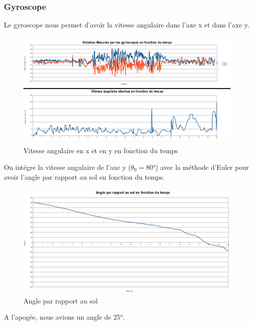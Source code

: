 \documentclass[a4paper,12pt]{scrartcl}
\begin{document}
	  \subsubsection{Gyroscope}
	  Le gyroscope nous permet d'avoir la vitesse angulaire dans l'axe x et dans l'axe y.
	  \begin{figure}[H]
		\begin{center}
		    \caption{ Vitesse angulaire en x et en y en fonction du temps }
		    \includegraphics[height=219px, width=458px]{analyse/rotation-vitesse-angulaire.png}
		\end{center}
	  \end{figure}
	  On intégre la vitesse angulaire de l'axe y ($\theta_0 = 80°$) avec la méthode d'Euler pour avoir l'angle par rapport au sol en fonction du temps.
	  \begin{figure}[H]
		\begin{center}
		    \caption{ Angle par rapport au sol }
		    \includegraphics[height=215px, width=432px]{analyse/angle.png}
		\end{center}
	  \end{figure}	
	  A l'apogée, nous avions un angle de 25°.
\end{document}
